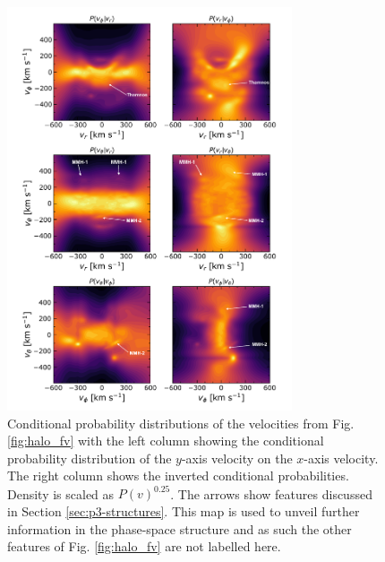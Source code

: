 \begin{figure}[t!]
    \centering
    \includegraphics[width=0.75\textwidth]{images/conditional_halo.pdf}
    \caption{Conditional probability distributions of the velocities from Fig. \ref{fig:halo_fv} with the left column showing the conditional probability distribution of the $y$-axis velocity on the $x$-axis velocity. The right column shows the inverted conditional probabilities. Density is scaled as $P(v)^{0.25}$. The arrows show features discussed in Section \ref{sec:p3-structures}. This map is used to unveil further information in the phase-space structure and as such the other features of Fig. \ref{fig:halo_fv} are not labelled here.} %
    \label{fig:cond_halo}
\end{figure}
